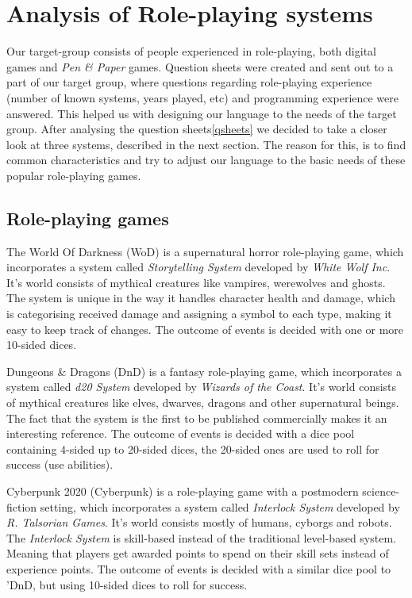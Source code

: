 \section{Analysis of Role-playing systems}
Our target-group consists of people experienced in role-playing, both digital games and \emph{Pen \& Paper} games. Question sheets were created and sent out to a part of our target group, where questions regarding role-playing experience (number of known systems, years played, etc) and programming experience were answered. This helped us with designing our language to the needs of the target group.
After analysing the question sheets\vref{qsheets} we decided to take a closer look at three systems, described in the next section. The reason for this, is to find common characteristics and try to adjust our language to the basic needs of these popular role-playing games.

\subsection*{Role-playing games}

The World Of Darkness (WoD) is a supernatural horror role-playing game, which incorporates a system called \emph{Storytelling System} developed by \emph{White Wolf Inc}. It's world consists of mythical creatures like vampires, werewolves and ghosts. The system is unique in the way it handles character health and damage, which is categorising received damage and assigning a symbol to each type, making it easy to keep track of changes. The outcome of events is decided with one or more 10-sided dices.\cite{wod}

Dungeons \& Dragons (DnD) is a fantasy role-playing game, which incorporates a system called \emph{d20 System} developed by \emph{Wizards of the Coast}.
It's world consists of mythical creatures like elves, dwarves, dragons and other supernatural beings. The fact that the system is the first to be published commercially makes it an interesting reference. The outcome of events is decided with a dice pool containing 4-sided up to 20-sided dices, the 20-sided ones are used to roll for success (use abilities).\cite{dnd}

Cyberpunk 2020 (Cyberpunk) is a role-playing game with a postmodern science-fiction setting, which incorporates a system called \emph{Interlock System} developed by \emph{R. Talsorian Games}. It's world consists mostly of humans, cyborgs and robots.
The \emph{Interlock System} is skill-based instead of the traditional level-based system. Meaning that players get awarded points to spend on their skill sets instead of experience points. The outcome of events is decided with a similar dice pool to 'DnD, but using 10-sided dices to roll for success.\cite{cyberpunk}

